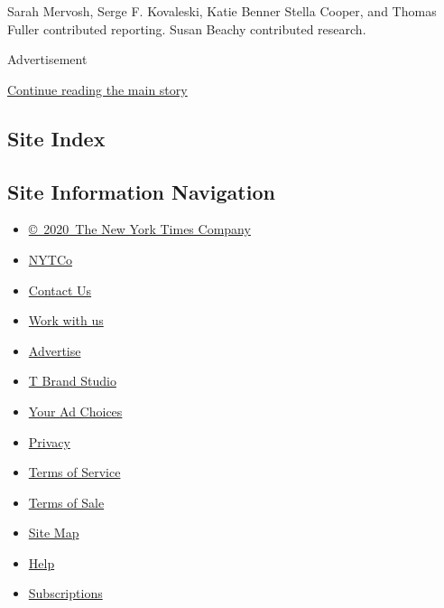 Sarah Mervosh, Serge F. Kovaleski, Katie Benner Stella Cooper, and
Thomas Fuller contributed reporting. Susan Beachy contributed research.

Advertisement

\protect\hyperlink{after-bottom}{Continue reading the main story}

\hypertarget{site-index}{%
\subsection{Site Index}\label{site-index}}

\hypertarget{site-information-navigation}{%
\subsection{Site Information
Navigation}\label{site-information-navigation}}

\begin{itemize}
\tightlist
\item
  \href{https://help.nytimes3xbfgragh.onion/hc/en-us/articles/115014792127-Copyright-notice}{©~2020~The
  New York Times Company}
\end{itemize}

\begin{itemize}
\tightlist
\item
  \href{https://www.nytco.com/}{NYTCo}
\item
  \href{https://help.nytimes3xbfgragh.onion/hc/en-us/articles/115015385887-Contact-Us}{Contact
  Us}
\item
  \href{https://www.nytco.com/careers/}{Work with us}
\item
  \href{https://nytmediakit.com/}{Advertise}
\item
  \href{http://www.tbrandstudio.com/}{T Brand Studio}
\item
  \href{https://www.nytimes3xbfgragh.onion/privacy/cookie-policy\#how-do-i-manage-trackers}{Your
  Ad Choices}
\item
  \href{https://www.nytimes3xbfgragh.onion/privacy}{Privacy}
\item
  \href{https://help.nytimes3xbfgragh.onion/hc/en-us/articles/115014893428-Terms-of-service}{Terms
  of Service}
\item
  \href{https://help.nytimes3xbfgragh.onion/hc/en-us/articles/115014893968-Terms-of-sale}{Terms
  of Sale}
\item
  \href{https://spiderbites.nytimes3xbfgragh.onion}{Site Map}
\item
  \href{https://help.nytimes3xbfgragh.onion/hc/en-us}{Help}
\item
  \href{https://www.nytimes3xbfgragh.onion/subscription?campaignId=37WXW}{Subscriptions}
\end{itemize}
